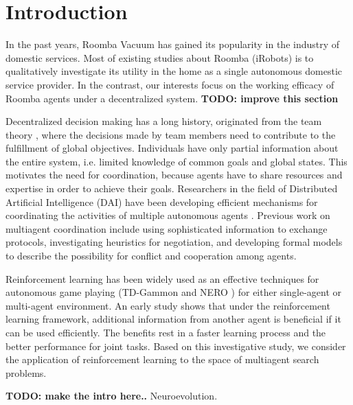 \documentclass[conference]{IEEEtran}
\begin{document}
\section{Introduction}
In the past years, Roomba Vacuum has gained its popularity in the industry of
domestic services.  Most of existing studies about Roomba (iRobots) is to 
qualitatively investigate its utility in the home as a single autonomous
domestic service provider. In the contrast, our interests focus on the working
efficacy of Roomba agents under a decentralized system. 
\textbf{TODO: improve this section}

Decentralized decision making has a long history, originated from the team
theory \cite{marschak1955elements, radner1962team,
    radner1959application, ho1972team, tsitsiklis1985complexity},
where the decisions made by team members need to contribute to the fulfillment
of global objectives. Individuals have only partial
information about the entire system, i.e. limited knowledge of common goals
and global states. This motivates the need for coordination, because agents
have to share resources and expertise in order to achieve their goals.
Researchers in the field of Distributed Artificial Intelligence (DAI) have
been developing efficient mechanisms for coordinating the activities of multiple
autonomous agents \cite{weiss1999multiagent, huhns2012distributed}. 
Previous work on multiagent coordination 
include using sophisticated information to exchange protocols, investigating
heuristics for negotiation, and developing formal models to describe the
possibility for conflict and cooperation among agents. 

Reinforcement learning has been widely used as an effective techniques for
autonomous game playing (TD-Gammon \cite{tesauro1994td} and NERO
\cite{stanley2005real}) for either single-agent or multi-agent environment. 
An early study \cite{tan1993multi} shows that under the reinforcement learning
framework, additional information from another agent is beneficial if it
can be used efficiently. The benefits rest in a faster learning process and the better performance for joint tasks.  
Based on this investigative study, we consider the application of reinforcement learning to the space of multiagent search problems.

\textbf{TODO: make the intro here..}
Neuroevolution.
\end{document}

